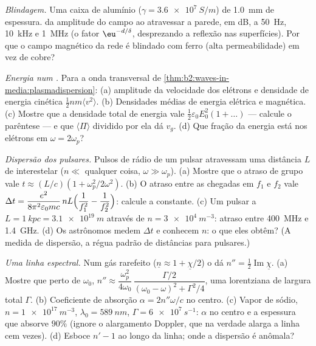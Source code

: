 \begin{exercise}[$\star\star$]\label{exo:b2:waves-in-media:6}
\emph{Blindagem.} Uma caixa de alumínio ($\gamma = \qty{3.6e7}{S/m}$) de \qty{1.0}{mm}
de espessura.  da amplitude do campo ao atravessar a parede, em dB, a
\qty{50}{Hz}, \qty{10}{kHz} e \qty{1}{MHz} (o fator $\eu^{-d/\delta}$, desprezando a reflexão nas
superfícies). Por que o campo magnético da rede é blindado
com ferro (alta permeabilidade) em vez de cobre?
\end{exercise}

\begin{exercise}[$\star\star$]\label{exo:b2:waves-in-media:7}
\emph{Energia num .} Para a onda transversal de
\cref{thm:b2:waves-in-media:plasmadispersion}: (a) amplitude da velocidade
dos elétrons e densidade de energia cinética $\tfrac12nm\langle v^2\rangle$. (b)
Densidades médias de energia elétrica e magnética. (c) Mostre que a densidade
total de energia vale $\tfrac12\varepsilon_0E_0^2(1 + \dots)$ --- calcule o parêntese ---
e que $\langle\Pi\rangle$ dividido por ela dá $v_g$. (d) Que fração da
energia está nos elétrons em $\omega = 2\omega_p$?
\end{exercise}

\begin{exercise}[$\star\star$]\label{exo:b2:waves-in-media:8}
\emph{Dispersão dos pulsares.} Pulsos de rádio de um pulsar atravessam uma distância
$L$ de  interestelar ($n \ll$ qualquer coisa, $\omega \gg \omega_p$). (a) Mostre
que o atraso de grupo vale $t \approx (L/c)(1 + \omega_p^2/2\omega^2)$. (b) O atraso
entre as chegadas em $f_1$ e $f_2$ vale $\Delta t = \dfrac{e^2}{8\pi^2
\varepsilon_0mc}\,nL\Bigl(\dfrac1{f_1^2} - \dfrac1{f_2^2}\Bigr)$: calcule a constante.
(c) Um pulsar a $L = \qty{1}{kpc} = \qty{3.1e19}{m}$ através de $n = \qty{3e4}{m^{-3}}$:
atraso entre \qty{400}{MHz} e \qty{1.4}{GHz}. (d) Os astrônomos medem
$\Delta t$ e conhecem $n$: o que eles obtêm? (A medida de dispersão, a
régua padrão de distâncias para pulsares.)
\end{exercise}

\begin{exercise}[$\star\star$]\label{exo:b2:waves-in-media:9}
\emph{Uma linha espectral.} Num gás rarefeito ($\underline n \approx 1 + \underline\chi/2$) o
 dá $n'' = \tfrac12\operatorname{Im}\underline\chi$. (a) Mostre que perto de
$\omega_0$, $n'' \approx \dfrac{\omega_p^2}{4\omega_0}\,\dfrac{\Gamma/2}{(\omega_0 - \omega)^2 + \Gamma^2/4}$, uma
lorentziana de largura total $\Gamma$. (b) Coeficiente de absorção $\alpha = 2n''\omega/c$
no centro. (c) Vapor de sódio, $n = \qty{1e17}{m^{-3}}$, $\lambda_0 = \qty{589}{nm}$,
$\Gamma = \qty{6e7}{s^{-1}}$: $\alpha$ no centro e a espessura que absorve
$90\%$ (ignore o alargamento Doppler, que na verdade alarga a linha
cem vezes). (d) Esboce $n' - 1$ ao longo da linha; onde a
dispersão é anômala?
\end{exercise}

